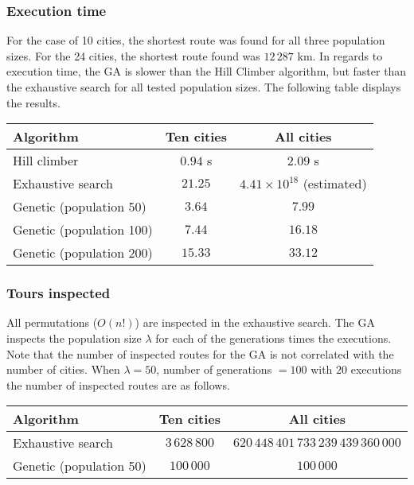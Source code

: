 \documentclass{article}
\begin{document}
\subsubsection*{Execution time}

For the case of 10 cities, the shortest route was found for all three population sizes. For the 24 cities, the shortest route found was $12\,287$ km. In regards to execution time, the GA is slower than the Hill Climber algorithm, but faster than the exhaustive search for all tested population sizes. The following table displays the results.

\begin{center}
\begin{tabular}{lcc}
\toprule
Algorithm & Ten cities & All cities \\
\midrule
Hill climber & $0.94$ s & $2.09$ s \\
Exhaustive search & $21.25$ & $4.41 \times 10^{18}$ (estimated) \\
Genetic (population 50) & $3.64$ & $7.99$ \\
Genetic (population 100) & $7.44$ & $16.18$ \\
Genetic (population 200) & $15.33$ & $33.12$ \\
\bottomrule
\end{tabular}
\end{center}

\subsubsection*{Tours inspected}

All permutations ($O(n!)$) are inspected in the exhaustive search. The GA inspects the population size $\lambda$ for each of the generations times the executions. Note that the number of inspected routes for the GA is not correlated with the number of cities. When $\lambda = 50$, number of generations $= 100$ with $20$ executions the number of inspected routes are as follows.

\begin{center}
\begin{tabular}{lcc}
\toprule
Algorithm & Ten cities & All cities \\
\midrule
Exhaustive search & $3\,628\,800$ & $620\,448\,401\,733\,239\,439\,360\,000$ \\
Genetic (population 50) & $100\,000$ & $100\,000$ \\
\bottomrule
\end{tabular}
\end{center}
\end{document}
